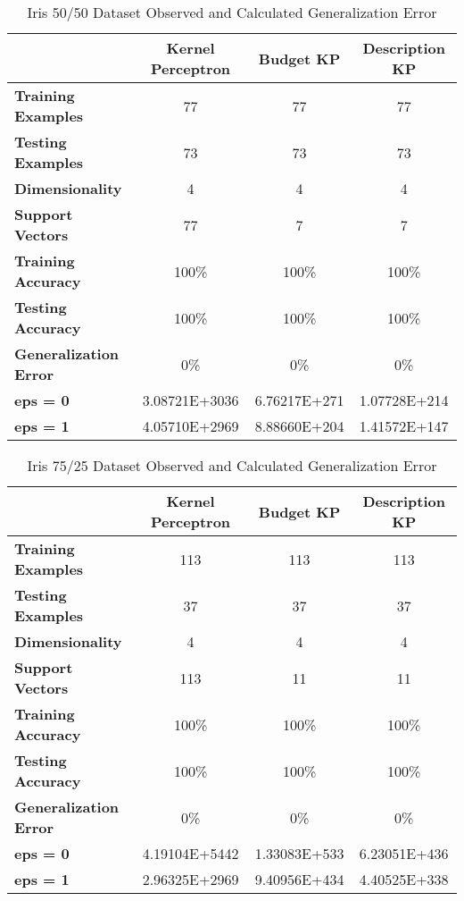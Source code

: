 \begin{table}[p]
 \begin{center}
  \caption{Iris 50/50 Dataset Observed and Calculated Generalization Error}
  \label{tab:iris50gencalc}
  \begin{tabular}{l|c|c|c}
  \textbf{ } & \textbf{Kernel Perceptron} & \textbf{Budget KP} & \textbf{Description KP}\\
  \hline
  \textbf{Training Examples} & 77 & 77 & 77\\
  \textbf{Testing Examples} & 73 & 73 & 73\\
  \textbf{Dimensionality} & 4 & 4 & 4\\
  \textbf{Support Vectors} & 77 & 7 & 7\\
  \hline
  \textbf{Training Accuracy} & 100\% & 100\% & 100\%\\
  \textbf{Testing Accuracy} & 100\% & 100\% & 100\%\\
  \textbf{Generalization Error} & 0\% & 0\% & 0\%\\
  \hline
  \textbf{eps = 0} & 3.08721E+3036 & 6.76217E+271 & 1.07728E+214\\
  \textbf{eps = 1} & 4.05710E+2969 & 8.88660E+204 & 1.41572E+147\\
  \end{tabular}
 \end{center}
\end{table}

\begin{table}[p]
 \begin{center}
  \caption{Iris 75/25 Dataset Observed and Calculated Generalization Error}
  \label{tab:iris75gencalc}
  \begin{tabular}{l|c|c|c}
  \textbf{ } & \textbf{Kernel Perceptron} & \textbf{Budget KP} & \textbf{Description KP}\\
  \hline
  \textbf{Training Examples} & 113 & 113 & 113\\
  \textbf{Testing Examples} & 37 & 37 & 37\\
  \textbf{Dimensionality} & 4 & 4 & 4\\
  \textbf{Support Vectors} & 113 & 11 & 11\\
  \hline
  \textbf{Training Accuracy} & 100\% & 100\% & 100\%\\
  \textbf{Testing Accuracy} & 100\% & 100\% & 100\%\\
  \textbf{Generalization Error} & 0\% & 0\% & 0\%\\
  \hline
  \textbf{eps = 0} & 4.19104E+5442 & 1.33083E+533 & 6.23051E+436\\
  \textbf{eps = 1} & 2.96325E+2969 & 9.40956E+434 & 4.40525E+338\\
  \end{tabular}
 \end{center}
\end{table}

